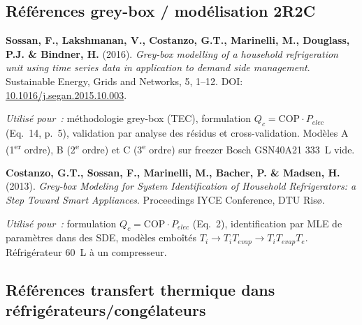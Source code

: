 \documentclass[11pt,a4paper]{article}
\begin{document}
\subsection*{Références grey-box / modélisation 2R2C}

\begin{enumerate}[label={[\arabic*]},itemsep=4pt]

\item \label{sossan2016}
\textbf{Sossan, F., Lakshmanan, V., Costanzo, G.T., Marinelli, M., Douglass, P.J. \&
Bindner, H.} (2016). \emph{Grey-box modelling of a household refrigeration unit using
time series data in application to demand side management}. Sustainable Energy, Grids
and Networks, 5, 1--12. DOI: \href{https://doi.org/10.1016/j.segan.2015.10.003}
{10.1016/j.segan.2015.10.003}.

\textit{Utilisé pour~:} méthodologie grey-box (TEC), formulation $Q_c = \mathrm{COP} \cdot
P_{elec}$ (Eq.~14, p.~5), validation par analyse des résidus et cross-validation. Modèles
A (1\textsuperscript{er} ordre), B (2\textsuperscript{e} ordre) et C (3\textsuperscript{e}
ordre) sur freezer Bosch GSN40A21 333~L vide.

\medskip
\item \label{costanzo2013}
\textbf{Costanzo, G.T., Sossan, F., Marinelli, M., Bacher, P. \& Madsen, H.} (2013).
\emph{Grey-box Modeling for System Identification of Household Refrigerators: a Step
Toward Smart Appliances}. Proceedings IYCE Conference, DTU Risø.

\textit{Utilisé pour~:} formulation $Q_c = \mathrm{COP} \cdot P_{elec}$ (Eq.~2),
identification par MLE de paramètres dans des SDE, modèles emboîtés
$T_i \to T_i T_{evap} \to T_i T_{evap} T_e$. Réfrigérateur 60~L à un compresseur.

\end{enumerate}

\subsection*{Références transfert thermique dans réfrigérateurs/congélateurs}
\end{document}
